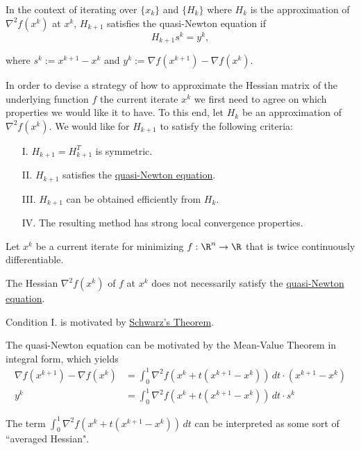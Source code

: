 \label{cc538a4}

In the context of iterating over $\{x_k\}$ and $\{H_k\}$ where $H_k$ is the
approximation of $\nabla^2f(x^k)$ at $x^k$, $H_{k+1}$ satisfies the
quasi-Newton equation if
$$
  H_{k+1}s^k=y^k,
$$

where $s^k:=x^{k+1}-x^k$ and $y^k:=\nabla f(x^{k+1})-\nabla f(x^k)$.

\label{f25ca2a}

In order to devise a strategy of how to approximate the Hessian matrix of the
underlying function $f$ the current iterate $x^k$ we first need to agree on
which properties we would like it to have. To this end, let $H_k$ be an
approximation of $\nabla^2f(x^k)$. We would like for $H_{k+1}$ to satisfy the
following criteria:
\begin{enumerate}
  \item [I.] $H_{k+1}=H_{k+1}^T$ is symmetric.
  \item [II.] $H_{k+1}$ satisfies the \href{cc538a4}{quasi-Newton equation}.
  \item [III.] $H_{k+1}$ can be obtained efficiently from $H_k$.
  \item [IV.] The resulting method has strong local convergence properties.
\end{enumerate}

\label{b19fe28}

Let $x^k$ be a current iterate for minimizing $f:\R^n\to\R$ that is twice
continuously differentiable.
\begin{enumerata}
  \item The Hessian $\nabla^2f(x^k)$ of $f$ at $x^k$ does not necessarily satisfy the
  \href{cc538a4}{quasi-Newton equation}.
  \item Condition I. is motivated by \href{c3524e9}{Schwarz's Theorem}.
  \item The quasi-Newton equation can be motivated by the Mean-Value Theorem in
  integral form, which yields
  \begin{align*}
    \nabla f(x^{k+1})-\nabla f(x^k)
        & =\int_0^1\nabla^2f(x^k+t(x^{k+1}-x^k))\,dt\cdot(x^{k+1}-x^k) \\
    y^k & =\int_0^1\nabla^2f(x^k+t(x^{k+1}-x^k))\,dt\cdot s^k
  \end{align*}

  The term $\int_0^1\nabla^2f(x^k+t(x^{k+1}-x^k))\,dt$ can be interpreted as some
  sort of ``averaged Hessian".
\end{enumerata}

